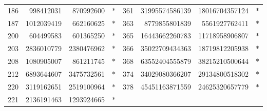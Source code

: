 \documentclass[10pt,a4paper,titlepage]{article}
\theoremstyle{plain}
\theoremstyle{definition}
\theoremstyle{remark}
\begin{document}
{\begin{longtable}{|r|r|rc||r|r|rc|}
186 & 998412031 & 870992600 & $\ast$ & 361 & 31995574586139 & 18016704357124 & $\ast$ \\
187 & 1012039419 & 662160625 & $\ast$ & 363 & 8779855801839 & 5561927762411 & $\ast$ \\
200 & 604499583 & 601365250 & $\ast$ & 365 & 16443662260783 & 11718958906807 & $\ast$ \\
203 & 2836010779 & 2380476962 & $\ast$ & 366 & 35022709434363 & 18719812205938 & $\ast$ \\
208 & 1080905007 & 861211745 & $\ast$ & 368 & 63552404555879 & 38215210500644 & $\ast$ \\
212 & 6893644607 & 3475732561 & $\ast$ & 374 & 34029080366207 & 29134800518302 & $\ast$ \\
220 & 3119162651 & 2519100964 & $\ast$ & 378 & 45451163871559 & 24625320657779 & $\ast$ \\
221 & 2136191463 & 1293924665 & $\ast$ &  &  &  &  \\
\hline
\end{longtable}
}
\end{document}
